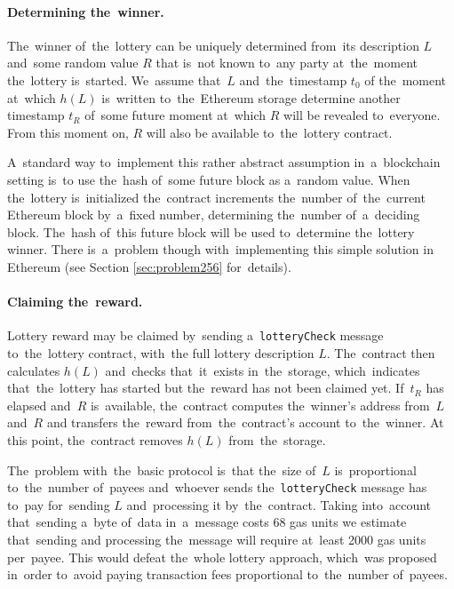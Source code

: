 \documentclass[a4paper]{article}
\begin{document}
    \paragraph{Determining the~winner.}
    The~winner of~the~lottery can be uniquely determined from~its description $L$ and~some random value $R$ that
    is~not known to~any party at~the~moment the~lottery is~started. We~assume that~$L$ and~the~timestamp $t_0$ of
    the~moment at~which $h(L)$ is~written to~the~Ethereum storage determine another timestamp $t_R$ of~some future
    moment at~which $R$ will be revealed to~everyone. From this moment on, $R$ will also be available to~the~lottery
    contract.

    A~standard way to~implement this rather abstract assumption in~a~blockchain setting is~to use the~hash of~some
    future block as a~random value. When the~lottery is~initialized the~contract increments the~number of~the~current
    Ethereum block by~a~fixed number, determining the~number of~a~deciding block. The~hash of~this future block will
    be used to~determine the~lottery winner. There is~a~problem though with~implementing this simple solution in
    Ethereum (see Section \ref{sec:problem256} for~details).

    \paragraph{Claiming the~reward.}
    Lottery reward may be claimed by~sending a~\texttt{lotteryCheck} message to~the~lottery contract, with~the
    full lottery description $L$. The~contract then calculates $h(L)$ and~checks that~it~exists in~the~storage,
    which~indicates that~the~lottery has started but the~reward has not been claimed yet.
    If~$t_R$ has elapsed and~$R$ is~available, the~contract computes the~winner's address from~$L$ and~$R$ and
    transfers the~reward from~the~contract's account to~the~winner. At this point, the~contract removes $h(L)$
    from~the~storage.

    The~problem with~the~basic protocol is~that the~size of~$L$ is~proportional to~the~number of~payees and~whoever
    sends the~\texttt{lotteryCheck} message has to~pay for~sending $L$ and~processing it by~the~contract.
    Taking into~account that~sending a~byte of~data in~a~message costs 68 gas units we estimate that~sending and
    processing the~message will require at~least 2000 gas units per~payee. This would defeat the~whole lottery
    approach, which~was proposed in~order to~avoid paying transaction fees proportional to~the~number of~payees.
\end{document}
